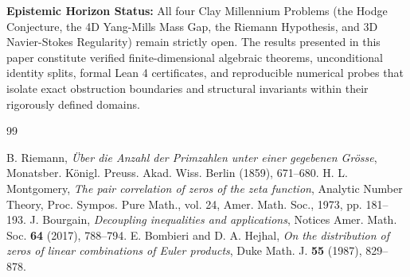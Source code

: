 \documentclass[11pt,a4paper]{article}
\theoremstyle{definition}
\begin{document}
\vspace{0.5em}
\noindent\textbf{Epistemic Horizon Status:} All four Clay Millennium Problems (the Hodge Conjecture, the 4D Yang-Mills Mass Gap, the Riemann Hypothesis, and 3D Navier-Stokes Regularity) remain strictly open. The results presented in this paper constitute verified finite-dimensional algebraic theorems, unconditional identity splits, formal Lean 4 certificates, and reproducible numerical probes that isolate exact obstruction boundaries and structural invariants within their rigorously defined domains.

\begin{thebibliography}{99}

 B. Riemann, \emph{\"Uber die Anzahl der Primzahlen unter einer gegebenen Gr\"osse}, Monatsber. K\"onigl. Preuss. Akad. Wiss. Berlin (1859), 671--680.
 H. L. Montgomery, \emph{The pair correlation of zeros of the zeta function}, Analytic Number Theory, Proc. Sympos. Pure Math., vol. 24, Amer. Math. Soc., 1973, pp. 181--193.
 J. Bourgain, \emph{Decoupling inequalities and applications}, Notices Amer. Math. Soc. \textbf{64} (2017), 788--794.
 E. Bombieri and D. A. Hejhal, \emph{On the distribution of zeros of linear combinations of Euler products}, Duke Math. J. \textbf{55} (1987), 829--878.

\end{thebibliography}
\end{document}
